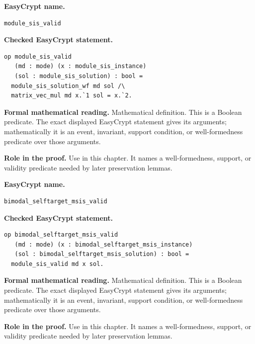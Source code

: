 \begin{formaldefinition}
\noindent\textbf{EasyCrypt name.}
\begin{lstlisting}[language=EasyCrypt,basicstyle=\ttfamily\scriptsize]
module_sis_valid
\end{lstlisting}
\noindent\textbf{Checked EasyCrypt statement.}
\begin{lstlisting}[language=EasyCrypt,basicstyle=\ttfamily\scriptsize]
op module_sis_valid
   (md : mode) (x : module_sis_instance)
   (sol : module_sis_solution) : bool =
  module_sis_solution_wf md sol /\
  matrix_vec_mul md x.`1 sol = x.`2.
\end{lstlisting}
\noindent\textbf{Formal mathematical reading.}
Mathematical definition. This is a Boolean predicate.  The exact displayed EasyCrypt statement gives its arguments; mathematically it is an event, invariant, support condition, or well-formedness predicate over those arguments.

\noindent\textbf{Role in the proof.}
Use in this chapter. It names a well-formedness, support, or validity predicate needed by later preservation lemmas.

\end{formaldefinition}

\begin{formaldefinition}
\noindent\textbf{EasyCrypt name.}
\begin{lstlisting}[language=EasyCrypt,basicstyle=\ttfamily\scriptsize]
bimodal_selftarget_msis_valid
\end{lstlisting}
\noindent\textbf{Checked EasyCrypt statement.}
\begin{lstlisting}[language=EasyCrypt,basicstyle=\ttfamily\scriptsize]
op bimodal_selftarget_msis_valid
   (md : mode) (x : bimodal_selftarget_msis_instance)
   (sol : bimodal_selftarget_msis_solution) : bool =
  module_sis_valid md x sol.
\end{lstlisting}
\noindent\textbf{Formal mathematical reading.}
Mathematical definition. This is a Boolean predicate.  The exact displayed EasyCrypt statement gives its arguments; mathematically it is an event, invariant, support condition, or well-formedness predicate over those arguments.

\noindent\textbf{Role in the proof.}
Use in this chapter. It names a well-formedness, support, or validity predicate needed by later preservation lemmas.

\end{formaldefinition}

